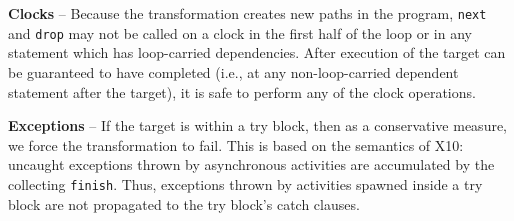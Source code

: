 {\bf Clocks} -- Because the transformation creates new paths in the program,
{\tt next} and {\tt drop} may not be called on a clock in the
first half of the loop or in any statement which has loop-carried
dependencies. %
After execution of the target can be guaranteed to have completed (i.e., at any
non-loop-carried dependent statement after the target), it is safe to perform
any of the clock operations.

{\bf Exceptions} -- If the target is within a try block, then as a
conservative measure, we force the transformation to fail.
This is based on the semantics of X10: uncaught exceptions thrown by
asynchronous activities are accumulated by the collecting {\tt finish}.
Thus, exceptions thrown by activities spawned inside a try block are not
propagated to the try block's catch clauses.
